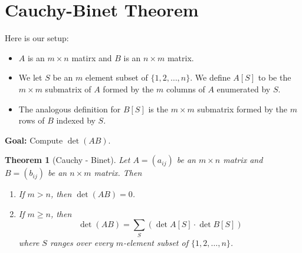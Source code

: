 \documentclass[10pt, letterpaper]{article}
\newtheorem{thm}{Theorem}
\theoremstyle{remark}
\theoremstyle{definition}
\begin{document}
    \section{Cauchy-Binet Theorem}

    Here is our setup:
        \begin{itemize}
            \item $A$ is an $m \times n$ matirx and $B$ is an $n \times m$ matrix.
            \item We let $S$ be an $m$ element subset of $\{1,2, \ldots, n\}$. We define
            $A[S]$ to be the $m \times m$ submatrix of $A$ formed by the $m$ columns of $A$ enumerated by $S$.
            \item The analogous definition for $B[S]$ is the $m \times m$ submatrix formed by the $m$ rows of $B$
            indexed by $S$.
        \end{itemize}

    \textbf{Goal: } Compute $\det (AB)$.

    \begin{thm}[Cauchy - Binet]
        Let $A=(a_{ij})$ be an $m \times n$ matrix and $B=(b_{ij})$ be an $n \times m$ matrix. Then
        \begin{enumerate}
            \item If $m > n$, then $\det(AB) = 0$.
            \item If $m \geq n$, then
            \[
                \det (AB) = \sum_{S} \left( \det A[S] \cdot \det B[S] \right)
            \]
            where $S$ ranges over every $m$-element subset of $\{1,2, \ldots, n\}$.
        \end{enumerate}
    \end{thm}
\end{document}
